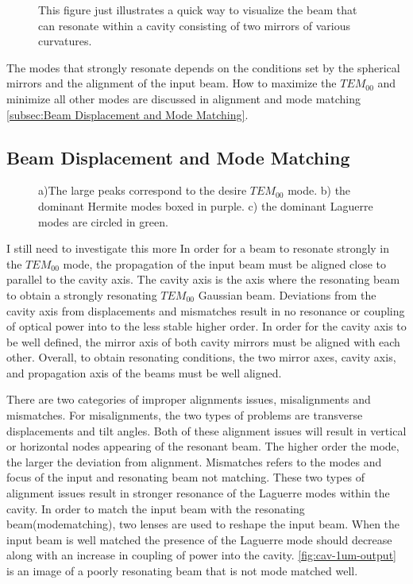 \documentclass[11pt,a4paper]{book}
\newcommand{\imginput}[1]{} %
\begin{document}
			\begin{figure} [!ht]
				\centering
				\def\svgwidth{\columnwidth}
				\resizebox{160mm}{!}{\imginput{images/cav-types.pdf_tex}}
				\caption{This figure just illustrates a quick way to visualize the beam that can resonate within a cavity consisting of two mirrors of various curvatures.
				}
				\label{fig:cav-types}
			\end{figure}	
			
			The modes that strongly resonate depends on the conditions set by the spherical mirrors and the alignment of the input beam.
			How to maximize the $TEM_{00}$ and minimize all other modes are discussed in alignment and mode matching \autoref{subsec:Beam Displacement and Mode Matching}.
		
		\subsection {Beam Displacement and Mode Matching}
			\label{subsec:Beam Displacement and Mode Matching}
			
			\begin{figure} [!ht]
				\centering
				\def\svgwidth{\columnwidth}
				\resizebox{150mm}{!}{\imginput{images/cav-1um-output.pdf_tex}}
				\caption{a)The large peaks correspond to the desire $TEM_{00}$ mode. b) the dominant Hermite modes boxed in purple. c) the dominant Laguerre modes are circled in green.
				}
				\label{fig:cav-1um-output}
			\end{figure}		
			I still need to investigate this more
			In order for a beam to resonate strongly in the $TEM_{00}$ mode, the propagation of the input beam must be aligned close to parallel to the cavity axis.
			The cavity axis is the axis where the resonating beam to obtain a strongly resonating $TEM_{00}$ Gaussian beam. Deviations from the cavity axis from displacements and mismatches result in no resonance or coupling of optical power into to the less stable higher order. In order for the cavity axis to be well defined, the mirror axis of both cavity mirrors must be aligned with each other. Overall, to obtain resonating conditions, the two mirror axes, cavity axis, and propagation axis of the beams must be well aligned.
			
			There are two categories of improper alignments issues, misalignments and mismatches. For misalignments, the two types of problems are transverse displacements and tilt angles. Both of these alignment issues will result in vertical or horizontal nodes appearing of the resonant beam. The higher order the mode, the larger the deviation from alignment. 
			Mismatches refers to the modes and focus of the input and resonating beam not matching. These two types of alignment issues result in stronger resonance of the Laguerre modes within the cavity. In order to match the input beam with the resonating beam(modematching), two lenses are used to reshape the input beam. When the input beam is well matched the presence of the Laguerre mode should decrease along with an increase in coupling of power into the cavity. \autoref{fig:cav-1um-output} is an image of a poorly resonating beam that is not mode matched well. 
\end{document}
